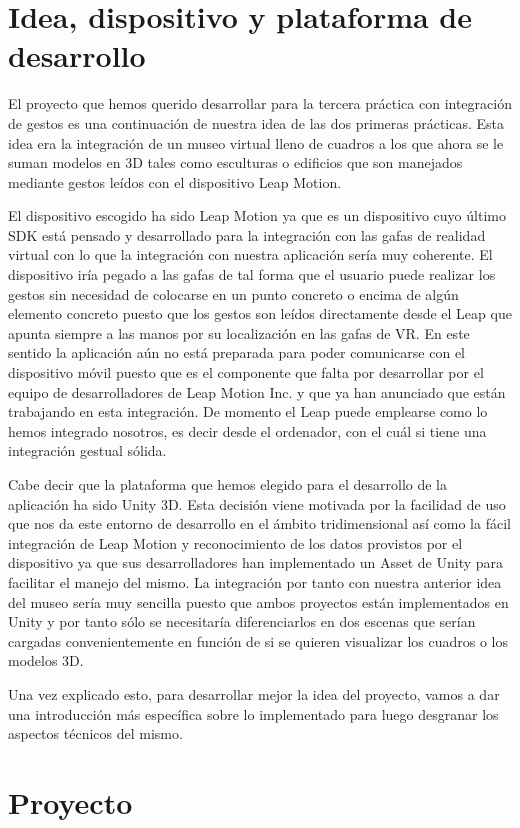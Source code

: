 \documentclass[a4paper,11pt]{article}
\begin{document}
\newpage

\tableofcontents

\newpage

\section{Idea, dispositivo y plataforma de desarrollo}

El proyecto que hemos querido desarrollar para la tercera práctica con integración de gestos es una continuación de nuestra idea de las dos primeras prácticas. Esta idea era la integración de un museo virtual lleno de cuadros a los que ahora se le suman modelos en 3D tales como esculturas o edificios que son manejados mediante gestos leídos con el dispositivo Leap Motion.

\vspace{10px}

El dispositivo escogido ha sido Leap Motion ya que es un dispositivo cuyo último SDK está pensado y desarrollado para la integración con las gafas de realidad virtual con lo que la integración con nuestra aplicación sería muy coherente. El dispositivo iría pegado a las gafas de tal forma que el usuario puede realizar los gestos sin necesidad de colocarse en un punto concreto o encima de algún elemento concreto puesto que los gestos son leídos directamente desde el Leap que apunta siempre a las manos por su localización en las gafas de VR. En este sentido la aplicación aún no está preparada para poder comunicarse con el dispositivo móvil puesto que es el componente que falta por desarrollar por el equipo de desarrolladores de Leap Motion Inc. y que ya han anunciado que están trabajando en esta integración. De momento el Leap puede emplearse como lo hemos integrado nosotros, es decir desde el ordenador, con el cuál si tiene una integración gestual sólida.

\vspace{10px}

Cabe decir que la plataforma que hemos elegido para el desarrollo de la aplicación ha sido Unity 3D. Esta decisión viene motivada por la facilidad de uso que nos da este entorno de desarrollo en el ámbito tridimensional así como la fácil integración de Leap Motion y reconocimiento de los datos provistos por el dispositivo ya que sus desarrolladores han implementado un Asset de Unity para facilitar el manejo del mismo. La integración por tanto con nuestra anterior idea del museo sería muy sencilla puesto que ambos proyectos están implementados en Unity y por tanto sólo se necesitaría diferenciarlos en dos escenas que serían cargadas convenientemente en función de si se quieren visualizar los cuadros o los modelos 3D.

\vspace{10px}

Una vez explicado esto, para desarrollar mejor la idea del proyecto, vamos a dar una introducción más específica sobre lo implementado para luego desgranar los aspectos técnicos del mismo.

\section{Proyecto}
\end{document}
